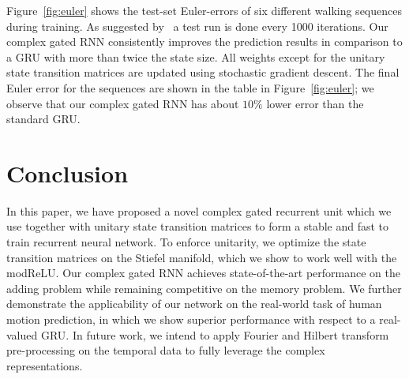 \documentclass{article}
\begin{document}
Figure~\ref{fig:euler} shows the test-set Euler-errors of six different walking sequences during training. As suggested by~\cite{martinez2017human} a test run is done every 1000 iterations. Our complex gated RNN consistently improves the prediction results in comparison to a GRU with more than twice the state size. All weights except for the unitary state transition matrices are updated using stochastic gradient descent.  The final Euler error for the sequences are shown in the table in Figure~\ref{fig:euler}; we observe that our complex gated RNN has about $10\%$ lower error than the standard GRU.  

\section{Conclusion}
In this paper, we have proposed a novel complex gated recurrent unit which we use together with unitary state transition matrices to form a stable and fast to train recurrent neural network.  To enforce unitarity, we optimize the state transition matrices on the Stiefel manifold, which we show to work well with the modReLU.  Our complex gated RNN achieves state-of-the-art performance on the adding problem while remaining competitive on the memory problem.  %
We further demonstrate the applicability of our network on the real-world task of human motion prediction, in which we show superior performance with respect to a real-valued GRU.  In future work, we intend to apply Fourier and Hilbert transform pre-processing on the temporal data to fully leverage the complex representations.


\end{document}
